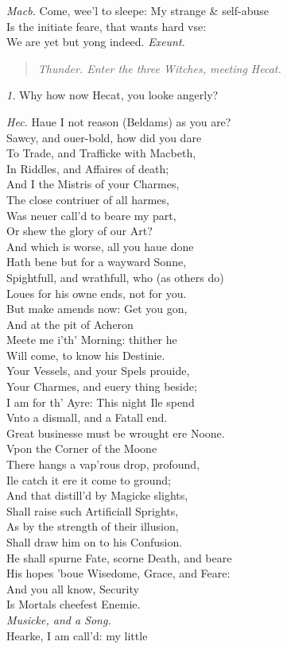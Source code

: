 \documentclass[12pt]{sides}
\newcommand{\StageDir}[1]{\begin{quote}\centering\em #1\end{quote}}
\newcommand{\clStageDir}[1]{\hspace*{\fill}\textit{#1}\hspace*{\fill}}
\newcommand{\elStageDir}[1]{\hfill\textit{#1}}
\newcommand{\dia}[1]{\hskip 15pt\textit{#1}\hskip 6pt}
\begin{document}
\begin{multicols}{2}
            \dia{Macb.} Come, wee'l to sleepe: My strange \& self-abuse \\ Is the initiate feare, that wants hard vse: \\ We are yet but yong indeed. \elStageDir{Exeunt.}
            \StageDir{Thunder. \hspace{4pt} Enter the three Witches, meeting Hecat.}
            \dia{1.} Why how now Hecat, you looke angerly?

            \dia{Hec.} Haue I not reason (Beldams) as you are? \\ Sawcy, and ouer-bold, how did you dare \\ To Trade, and Trafficke with Macbeth, \\ In Riddles, and Affaires of death; \\ And I the Mistris of your Charmes, \\ The close contriuer of all harmes, \\ Was neuer call'd to beare my part, \\ Or shew the glory of our Art? \\ And which is worse, all you haue done \\ Hath bene but for a wayward Sonne, \\ Spightfull, and wrathfull, who (as others do) \\ Loues for his owne ends, not for you. \\ But make amends now: Get you gon, \\ And at the pit of Acheron \\ Meete me i'th' Morning: thither he \\ Will come, to know his Destinie. \\ Your Vessels, and your Spels prouide, \\ Your Charmes, and euery thing beside; \\ I am for th' Ayre: This night Ile spend \\ Vnto a dismall, and a Fatall end. \\ Great businesse must be wrought ere Noone. \\ Vpon the Corner of the Moone \\ There hangs a vap'rous drop, profound, \\ Ile catch it ere it come to ground; \\ And that distill'd by Magicke slights, \\ Shall raise such Artificiall Sprights, \\ As by the strength of their illusion, \\ Shall draw him on to his Confusion. \\ He shall spurne Fate, scorne Death, and beare \\ His hopes 'boue Wisedome, Grace, and Feare: \\ And you all know, Security \\ Is Mortals cheefest Enemie. \\ \clStageDir{Musicke, and a Song.} \\ Hearke, I am call'd: my little 
\end{multicols}
\end{document}
